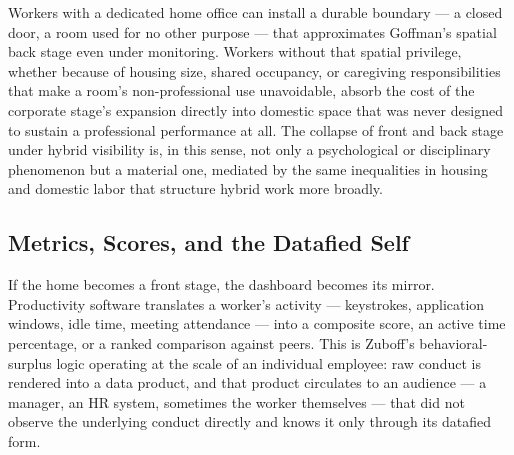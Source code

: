 \documentclass[10pt]{article}
\begin{document}
Workers with a dedicated home office can install a durable boundary --- a closed door, a room used for no other purpose --- that approximates Goffman's spatial back stage even under monitoring. Workers without that spatial privilege, whether because of housing size, shared occupancy, or caregiving responsibilities that make a room's non-professional use unavoidable, absorb the cost of the corporate stage's expansion directly into domestic space that was never designed to sustain a professional performance at all. The collapse of front and back stage under hybrid visibility is, in this sense, not only a psychological or disciplinary phenomenon but a material one, mediated by the same inequalities in housing and domestic labor that structure hybrid work more broadly.

\subsection{Metrics, Scores, and the Datafied Self}

If the home becomes a front stage, the dashboard becomes its mirror. Productivity software translates a worker's activity --- keystrokes, application windows, idle time, meeting attendance --- into a composite score, an active time percentage, or a ranked comparison against peers. This is Zuboff's behavioral-surplus logic operating at the scale of an individual employee: raw conduct is rendered into a data product, and that product circulates to an audience --- a manager, an HR system, sometimes the worker themselves --- that did not observe the underlying conduct directly and knows it only through its datafied form.
\end{document}
